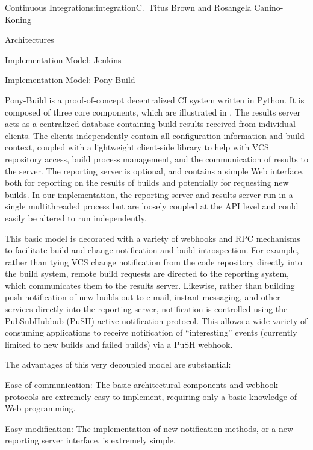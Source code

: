 \begin{aosachapter}{Continuous Integration}{s:integration}{C.\ Titus Brown and Rosangela Canino-Koning}
\begin{aosasect1}{Architectures}
\begin{aosasect2}{Implementation Model: Jenkins}
\end{aosasect2}

\begin{aosasect2}{Implementation Model: Pony-Build}


Pony-Build is a proof-of-concept decentralized CI system written in
Python. It is composed of three core components, which are illustrated
in . The results server acts as a
centralized database containing build results received from individual
clients. The clients independently contain all configuration
information and build context, coupled with a lightweight client-side
library to help with VCS repository access, build process management,
and the communication of results to the server. The reporting server
is optional, and contains a simple Web interface, both for reporting
on the results of builds and potentially for requesting new builds. In
our implementation, the reporting server and results server run in a
single multithreaded process but are loosely coupled at the API level
and could easily be altered to run independently.

This basic model is decorated with a variety of webhooks and RPC
mechanisms to facilitate build and change notification and build
introspection. For example, rather than tying VCS change notification
from the code repository directly into the build system, remote build
requests are directed to the reporting system, which communicates them
to the results server. Likewise, rather than building push
notification of new builds out to e-mail, instant messaging, and other
services directly into the reporting server, notification is
controlled using the PubSubHubbub (PuSH) active notification
protocol. This allows a wide variety of consuming applications to
receive notification of ``interesting'' events (currently limited to
new builds and failed builds) via a PuSH webhook.

The advantages of this very decoupled model are substantial:

\begin{aosadescription}

  \item{Ease of communication:} The basic architectural
  components and webhook protocols are extremely easy to implement,
  requiring only a basic knowledge of Web programming.

  \item{Easy modification:} The implementation of new
  notification methods, or a new reporting server interface, is
  extremely simple.


\end{aosadescription}
\end{aosasect2}
\end{aosasect1}
\end{aosachapter}

